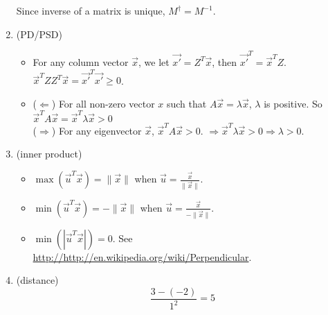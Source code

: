 \begin{enumerate}[(1)]
		Since inverse of a matrix is unique, $M^{\dagger}=M^{-1}$.
	\item (PD/PSD)
		\begin{itemize}
			\item For any column vector $\vec{x}$, we let $\vec{x'} = Z^T\vec{x}$,
				then $\vec{x'}^T = \vec{x}^TZ$.$\vec{x}^TZZ^T \vec{x} = \vec{x'}^T\vec{x'} \geq 0$.
			\item ($\Leftarrow$) For all non-zero vector $x$ such that
				$A\vec{x} = \lambda \vec{x}$, $\lambda$ is positive.  So
				$\vec{x}^TA\vec{x} = \vec{x}^T\lambda \vec{x} > 0$ \\
				($\Rightarrow$) For any eigenvector $\vec{x}$, $\vec{x}^TA\vec{x} > 0$.
				$\Rightarrow \vec{x}^T\lambda \vec{x} > 0 \Rightarrow \lambda > 0$.
		\end{itemize}
	\item (inner product)
		\begin{itemize}
			\item $\max(\vec{u}^T\vec{x})=\|\vec{x}\|$ when $\vec{u}=\frac{\vec{x}}{\|\vec{x}\|}$.
			\item $\min(\vec{u}^T\vec{x})=-\|\vec{x}\|$ when $\vec{u}=\frac{\vec{x}}{-\|\vec{x}\|}$.
			\item $\min(|\vec{u}^T\vec{x}|)=0$.  See \url{http://http://en.wikipedia.org/wiki/Perpendicular}.
		\end{itemize}
	\item (distance) \\
		\[ \frac{3 - (-2)}{1^2} = 5\]
\end{enumerate}
